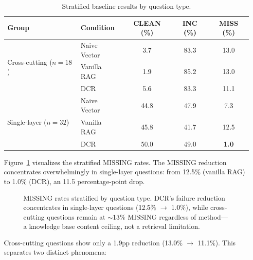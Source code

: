 \documentclass[11pt,a4paper]{article}
\begin{document}
\begin{table}[h]
\centering
\caption{Stratified baseline results by question type.}
\label{tab:stratified}
\begin{tabular}{@{}llccc@{}}
\toprule
Group & Condition & CLEAN (\%) & INC (\%) & MISS (\%) \\
\midrule
\multirow{3}{*}{Cross-cutting ($n=18$)} & Naive Vector & 3.7 & 83.3 & 13.0 \\
 & Vanilla RAG & 1.9 & 85.2 & 13.0 \\
 & DCR & 5.6 & 83.3 & 11.1 \\
\midrule
\multirow{3}{*}{Single-layer ($n=32$)} & Naive Vector & 44.8 & 47.9 & 7.3 \\
 & Vanilla RAG & 45.8 & 41.7 & 12.5 \\
 & DCR & 50.0 & 49.0 & \textbf{1.0} \\
\bottomrule
\end{tabular}
\end{table}

Figure~\ref{fig:stratified} visualizes the stratified MISSING rates. The MISSING reduction concentrates overwhelmingly in single-layer questions: from 12.5\% (vanilla RAG) to 1.0\% (DCR), an 11.5 percentage-point drop.

\begin{figure}[t]
\centering
{}
\caption{MISSING rates stratified by question type. DCR's failure reduction concentrates in single-layer questions (12.5\% $\to$ 1.0\%), while cross-cutting questions remain at $\sim$13\% MISSING regardless of method---a knowledge base content ceiling, not a retrieval limitation.}
\label{fig:stratified}
\end{figure} Cross-cutting questions show only a 1.9pp reduction (13.0\% $\to$ 11.1\%). This separates two distinct phenomena:
\end{document}
